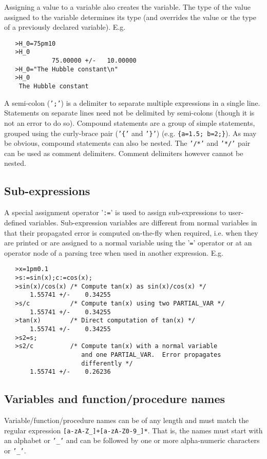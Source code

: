 \documentclass[11pt]{article}
\begin{document}
Assigning a value to a variable also creates the variable.  The type
of the value assigned to the variable determines its type (and overrides
the value or the type of a previously declared variable).  E.g.
\begin{verbatim}
   >H_0=75pm10
   >H_0
             75.00000 +/-   10.00000
   >H_0="The Hubble constant\n"
   >H_0
    The Hubble constant
\end{verbatim}
A semi-colon ({\tt ';'}) is a delimiter to separate multiple
expressions in a single line.  Statements on separate lines need not
be delimited by semi-colons (though it is not an error to do so).
Compound statements are a group of simple statements, grouped using the
curly-brace pair ({\tt '\{'} and {\tt '\}'}) (e.g. {\tt \{a=1.5;
b=2;\}}). As may be obvious, compound statements can also be nested.
The {\tt '/\/*'} and {\tt '*/'} pair can be used as comment
delimiters.  Comment delimiters however cannot be nested. 

\subsection{Sub-expressions}
\label{APPEN:SUBEXPRESSIONS}

A special assignment operator '{\tt :=}' is used to assign
sub-expressions to user-defined variables.  Sub-expression variables
are different from normal variables in that their propagated error is
computed on-the-fly when required, i.e.  when they are printed or are
assigned to a normal variable using the '{\tt =}' operator or at an
operator node of a parsing tree when used in another expression.  E.g.
\begin{verbatim}
   >x=1pm0.1
   >s:=sin(x);c:=cos(x);
   >sin(x)/cos(x) /* Compute tan(x) as sin(x)/cos(x) */
       1.55741 +/-    0.34255
   >s/c           /* Compute tan(x) using two PARTIAL_VAR */
       1.55741 +/-    0.34255
   >tan(x)        /* Direct computation of tan(x) */
       1.55741 +/-    0.34255
   >s2=s;
   >s2/c          /* Compute tan(x) with a normal variable
                     and one PARTIAL_VAR.  Error propagates 
                     differently */
       1.55741 +/-    0.26236
\end{verbatim}
\subsection{Variables and function/procedure names}

Variable/function/procedure names can be of any length and must match
the regular expression {\tt [a-zA-Z\_]+[a-zA-Z0-9\_]*}.  That is, the
names must start with an alphabet or {\tt '\_'} and can be followed by
one or more alpha-numeric characters or {\tt '\_'}.
\end{document}
